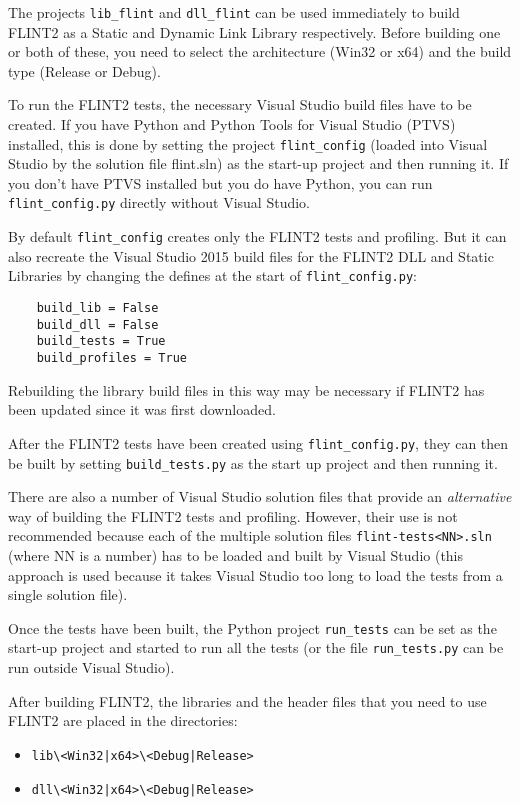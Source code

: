 \documentclass[a4paper,10pt]{book}
\newcommand{\code}{\lstinline}
\begin{document}
The projects \code{lib_flint} and \code{dll_flint} can be used immediately to
build FLINT2 as a Static and Dynamic Link Library respectively.
Before building one or both of these, you need to select the
architecture (Win32 or x64) and the build type (Release or Debug).

To run the FLINT2 tests, the necessary Visual Studio build files
have to be created.  If you have Python and Python Tools for
Visual Studio (PTVS) installed, this is done by setting the 
project \code{flint_config} (loaded into Visual Studio by the solution
file flint.sln) as the start-up project and then running it.
If you don't have PTVS installed but you do have Python, you
can run \code{flint_config.py} directly without Visual Studio. 
   
By default \code{flint_config} creates only the FLINT2 tests and profiling.
But it can also recreate the Visual Studio 2015 build files for the
FLINT2 DLL and Static Libraries by changing the defines at the
start of \code{flint_config.py}: 

\begin{verbatim}
    build_lib = False
    build_dll = False
    build_tests = True
    build_profiles = True
\end{verbatim}

Rebuilding the library build files in this way may be necessary
if FLINT2 has been updated since it was first downloaded. 
      
After the FLINT2 tests have been created using \code{flint_config.py},
they can then be built by setting \code{build_tests.py} as the start up
project and then running it.

There are also a number of Visual Studio solution files that
provide an \emph{alternative} way of building the FLINT2 tests and
profiling.  However, their use is not recommended because each
of the multiple solution files \code{flint-tests<NN>.sln} (where NN
is a number) has to be loaded and built by Visual Studio (this
approach is used because it takes Visual Studio too long to
load the tests from a single solution file).

Once the tests have been built, the Python project \code{run_tests} can
be set as the start-up project and started to run all the tests 
(or the file \code{run_tests.py} can be run outside Visual Studio).
   
After building FLINT2, the libraries and the header files that 
you need to use FLINT2 are placed in the directories:
\begin{itemize}
\item \code{lib\<Win32|x64>\<Debug|Release>}
\item \code{dll\<Win32|x64>\<Debug|Release>}
\end{itemize}
\end{document}
